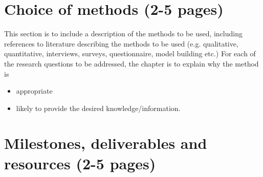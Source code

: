 \documentclass[informationsecurity]{gucmasterproject}
\begin{document}
%
%

\chapter{Choice of methods (2-5 pages)}
This section is to include a description of the methods to be used,
including references to literature describing the methods to be used
(e.g. qualitative, quantitative, interviews, surveys,
questionnaire,  model building etc.)
For each of the research questions to be addressed,
the chapter is to explain why the method is
\begin{itemize}
\item appropriate
\item likely to provide the desired knowledge/information.
\end{itemize}


\chapter{Milestones, deliverables and resources (2-5 pages)}
\end{document}
